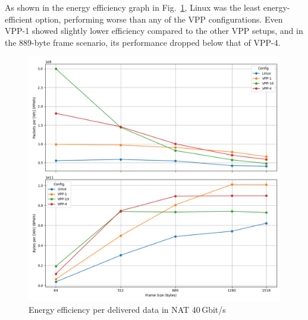 As shown in the energy efficiency graph in Fig.~\ref{fig:nat-40g}, Linux was the least energy-efficient option, performing worse than any of the VPP configurations. 
Even VPP-1 showed slightly lower efficiency compared to the other VPP setups, and in the 889-byte frame scenario, its performance dropped below that of VPP-4.

\begin{figure}[!htbp]
    \centering
    \includegraphics[width=\linewidth]{images/consumption-nat-40g.png}
    \caption{Energy efficiency per delivered data in NAT 40\,Gbit/s}
    \label{fig:nat-40g}
\end{figure}

